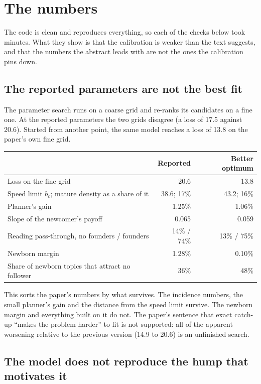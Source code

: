 \section{The numbers}\label{sec:crit-calib}

The code is clean and reproduces everything, so each of the checks below took minutes. What they show is that the calibration is weaker than the text suggests, and that the numbers the abstract leads with are not the ones the calibration pins down.

\subsection{The reported parameters are not the best fit}

The parameter search runs on a coarse grid and re-ranks its candidates on a fine one. At the reported parameters the two grids disagree (a loss of 17.5 against 20.6). Started from another point, the same model reaches a loss of 13.8 on the paper's own fine grid.

\begin{center}\small
\begin{tabularx}{0.92\textwidth}{@{}Lrr@{}}
\toprule
 & Reported & Better optimum \\
\midrule
Loss on the fine grid & 20.6 & 13.8 \\
Speed limit $b_c$; mature density as a share of it & 38.6; 17\% & 43.2; 16\% \\
Planner's gain & 1.25\% & 1.06\% \\
Slope of the newcomer's payoff & 0.065 & 0.059 \\
Reading pass-through, no founders / founders & 14\% / 74\% & 13\% / 75\% \\
Newborn margin & 1.28\% & 0.10\% \\
Share of newborn topics that attract no follower & 36\% & 48\% \\
\bottomrule
\end{tabularx}
\end{center}

This sorts the paper's numbers by what survives. The incidence numbers, the small planner's gain and the distance from the speed limit survive. The newborn margin and everything built on it do not. The paper's sentence that exact catch-up ``makes the problem harder'' to fit is not supported: all of the apparent worsening relative to the previous version (14.9 to 20.6) is an unfinished search.

\subsection{The model does not reproduce the hump that motivates it}

